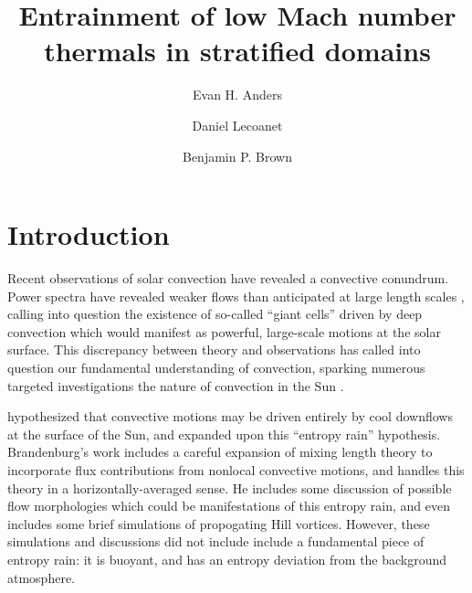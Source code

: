 \documentclass[twocolumn, amsmath, amsfonts, amssymb, trackchanges]{aastex62}
\begin{document}
\title{Entrainment of low Mach number thermals in stratified domains}


\author[0000-0002-3433-4733]{Evan H. Anders}
\author[0000-0002-7635-9728]{Daniel Lecoanet}
\author[0000-0001-8935-219X]{Benjamin P. Brown}


\begin{abstract}
\end{abstract}


\section{Introduction}
\label{sec:intro}
Recent observations of solar convection have revealed a convective conundrum.
Power spectra have revealed weaker flows than anticipated at large length scales \citep{hanasoge&all2012, greer&all2015}, calling into question the existence of so-called ``giant cells'' driven by deep convection which would manifest as powerful, large-scale motions at the solar surface. 
This discrepancy between theory and observations has called into question our fundamental understanding of convection, sparking numerous targeted investigations the nature of convection in the Sun  \citep{featherstone&hindman2016, omara&all2016, cossette&rast2016, kapyla&all2017, hotta2017}.

\cite{spruit1997} hypothesized that convective motions may be driven entirely by cool downflows at the surface of the Sun, and \citet{brandenburg2016} expanded upon this ``entropy rain'' hypothesis. 
Brandenburg's work includes a careful expansion of mixing length theory to incorporate flux contributions from nonlocal convective motions, and handles this theory in a horizontally-averaged sense.
He includes some discussion of possible flow morphologies which could be manifestations of this entropy rain, and even includes some brief simulations of propogating Hill vortices. 
However, these simulations and discussions did not include include a fundamental piece of entropy rain: it is buoyant, and has an entropy deviation from the background atmosphere.
\end{document}
